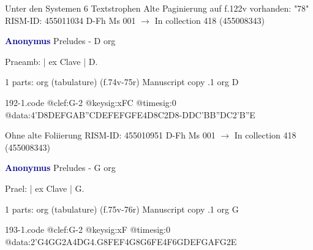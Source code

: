 \documentclass[twocolumn]{book}
\begin{document}
\newline Unter den Systemen 6 Textstrophen
\newline Alte Paginierung auf f.122v vorhanden: "78"
\newline RISM-ID: 455011034
\newline D-Fh  Ms 001
\newline $\rightarrow$ In collection 418 (455008343)
      
\newline \par \vspace{7pt} \textcolor{darkblue}{\textbf{Anonymus  }}
\newline Preludes - D
\newline org
\newline \begin{itshape}[f.74v, at left:] Praeamb: | ex Clave | D.\end{itshape} 
\newline \textcolor{darkblue}{}  1 parts: org (tabulature)  (f.74v-75r)
\newline Manuscript copy
.1  org  D  
\begin{filecontents*}{192-1.code}
@clef:G-2
@keysig:xFC
@timesig:0
@data:4'D{8DE}{FGAB}{''CDEF}{EFGF}E4D8C2D8-{DDC}{'BB''DC}2'B''E
\end{filecontents*}
\newline
%

\newline Ohne alte Foliierung
\newline RISM-ID: 455010951
\newline D-Fh  Ms 001
\newline $\rightarrow$ In collection 418 (455008343)
      
\newline \par \vspace{7pt} \textcolor{darkblue}{\textbf{Anonymus  }}
\newline Preludes - G
\newline org
\newline \begin{itshape}[f.75v, at left:] Prael: | ex Clave | G.\end{itshape} 
\newline \textcolor{darkblue}{}  1 parts: org (tabulature)  (f.75v-76r)
\newline Manuscript copy
.1  org  G  
\begin{filecontents*}{193-1.code}
@clef:G-2
@keysig:xF
@timesig:0
@data:2'G4GG2A4DG4.G8F{EF}4G{8G6FE}4F{6GDEF}{GAFG}2E
\end{filecontents*}
\newline
%
\end{document}
